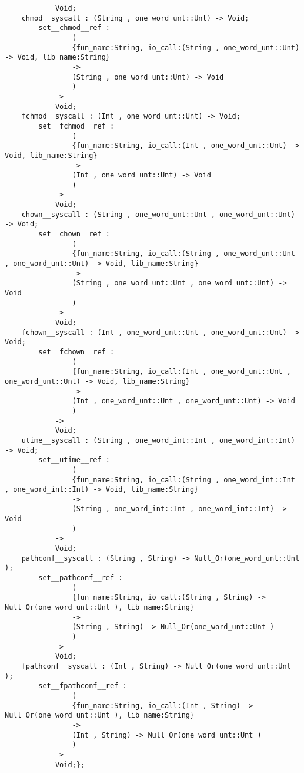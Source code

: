 \begin{verbatim}
            Void;
    chmod__syscall : (String , one_word_unt::Unt) -> Void;
        set__chmod__ref :
                (
                {fun_name:String, io_call:(String , one_word_unt::Unt) -> Void, lib_name:String}
                ->
                (String , one_word_unt::Unt) -> Void
                )
            ->
            Void;
    fchmod__syscall : (Int , one_word_unt::Unt) -> Void;
        set__fchmod__ref :
                (
                {fun_name:String, io_call:(Int , one_word_unt::Unt) -> Void, lib_name:String}
                ->
                (Int , one_word_unt::Unt) -> Void
                )
            ->
            Void;
    chown__syscall : (String , one_word_unt::Unt , one_word_unt::Unt) -> Void;
        set__chown__ref :
                (
                {fun_name:String, io_call:(String , one_word_unt::Unt , one_word_unt::Unt) -> Void, lib_name:String}
                ->
                (String , one_word_unt::Unt , one_word_unt::Unt) -> Void
                )
            ->
            Void;
    fchown__syscall : (Int , one_word_unt::Unt , one_word_unt::Unt) -> Void;
        set__fchown__ref :
                (
                {fun_name:String, io_call:(Int , one_word_unt::Unt , one_word_unt::Unt) -> Void, lib_name:String}
                ->
                (Int , one_word_unt::Unt , one_word_unt::Unt) -> Void
                )
            ->
            Void;
    utime__syscall : (String , one_word_int::Int , one_word_int::Int) -> Void;
        set__utime__ref :
                (
                {fun_name:String, io_call:(String , one_word_int::Int , one_word_int::Int) -> Void, lib_name:String}
                ->
                (String , one_word_int::Int , one_word_int::Int) -> Void
                )
            ->
            Void;
    pathconf__syscall : (String , String) -> Null_Or(one_word_unt::Unt );
        set__pathconf__ref :
                (
                {fun_name:String, io_call:(String , String) -> Null_Or(one_word_unt::Unt ), lib_name:String}
                ->
                (String , String) -> Null_Or(one_word_unt::Unt )
                )
            ->
            Void;
    fpathconf__syscall : (Int , String) -> Null_Or(one_word_unt::Unt );
        set__fpathconf__ref :
                (
                {fun_name:String, io_call:(Int , String) -> Null_Or(one_word_unt::Unt ), lib_name:String}
                ->
                (Int , String) -> Null_Or(one_word_unt::Unt )
                )
            ->
            Void;};
\end{verbatim}
